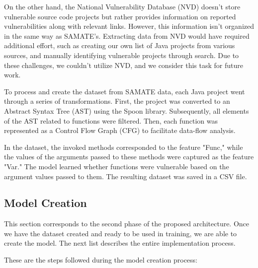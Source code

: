\documentclass[journal,a4paper]{IEEEtran}
\begin{document}
On the other hand, the National Vulnerability Database (NVD) doesn't store vulnerable source code projects but rather provides information on reported vulnerabilities along with relevant links. However, this information isn't organized in the same way as SAMATE's. Extracting data from NVD would have required additional effort, such as creating our own list of Java projects from various sources, and manually identifying vulnerable projects through search. Due to these challenges, we couldn't utilize NVD, and we consider this task for future work.

To process and create the dataset from SAMATE data, each Java project went through a series of transformations. First, the project was converted to an Abstract Syntax Tree (AST) using the Spoon library. Subsequently, all elements of the AST related to functions were filtered. Then, each function was represented as a Control Flow Graph (CFG) to facilitate data-flow analysis.

In the dataset, the invoked methods corresponded to the feature "Func," while the values of the arguments passed to these methods were captured as the feature "Var." The model learned whether functions were vulnerable based on the argument values passed to them. The resulting dataset was saved in a CSV file.

\subsection{Model Creation}

This section corresponds to the second phase of the proposed architecture. Once we have the dataset created and ready to be used in training, we are able to create the model. The next list describes the entire implementation process.

These are the steps followed during the model creation process:
\end{document}
